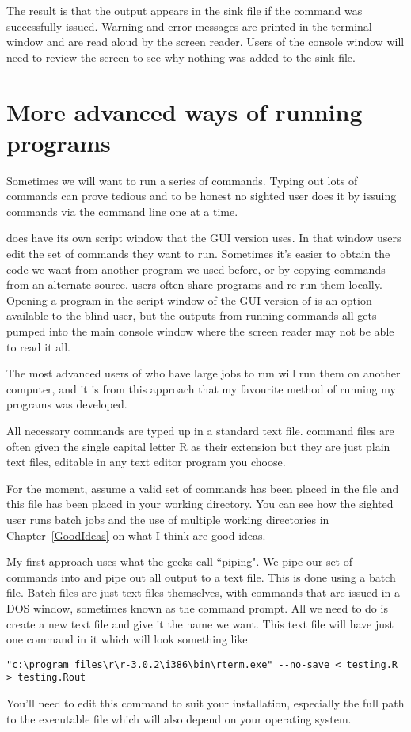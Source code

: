 The result is that the output appears in the sink file if the command was successfully issued. Warning and error messages are printed in the terminal window and are read aloud by the screen reader. Users of the \R{} console window will need to review the screen to see why nothing was added to the sink file.



\section{More advanced ways of running \R{} programs}

Sometimes we will want to run a series of commands. Typing out lots of commands can prove tedious and to be honest no sighted \R{} user does it by issuing commands via the command line one at a time.

\R{} does have its own script window that the GUI version uses. In that window users edit the set of commands they want to run. Sometimes it's easier to obtain the code we want from another \R{} program we used before, or by copying commands from an alternate source. \R{} users often share programs and re-run them locally. Opening a \R{} program in the script window of the GUI version of \R{} is an option available to the blind user, but the outputs from running commands all gets pumped into the main console window where the screen reader may not be able to read it all.

The most advanced users of \R{} who have large jobs to run will run them on another computer, and it is from this approach that my favourite method of running my \R{} programs was developed.

All necessary commands are typed up in a standard text file. \R{} command files are often given the single capital letter R as their extension but they are just plain text files, editable in any text editor program you choose.

For the moment, assume a valid set of commands has been placed in the file  and this file has been placed in your working directory. You can see how the sighted \R{} user runs batch jobs and the use of multiple working directories in Chapter~\ref{GoodIdeas} on what I think are good ideas.

My first approach uses what the geeks call ``piping". We pipe our set of commands into \R{} and pipe out all output to a text file. This is done using a batch file.
Batch files are just text files themselves, with commands that are issued in a DOS window, sometimes known as the command prompt. All we need to do is create a new text file and give it the name we want. This text file will have just one command in it which will look something like
\begin{verbatim}
"c:\program files\r\r-3.0.2\i386\bin\rterm.exe" --no-save < testing.R > testing.Rout
\end{verbatim}
You'll need to edit this command to suit your installation, especially the full path to the executable file which will also depend on your operating system.

